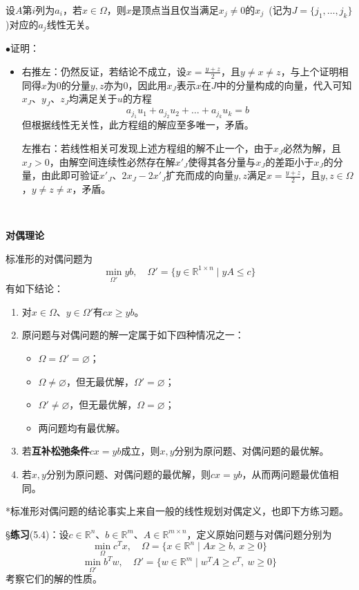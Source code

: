 \documentclass[a4paper,UTF8,fontset=windows]{ctexart}
\newcommand{\exce}[2]{\S\textbf{练习}(#1)：{\kaishu #2}}
\newcommand{\proo}[1]{{\kaishu $\bullet$证明：
\begin{itemize}
    \item[] #1
\end{itemize}
}}
\begin{document}
设$A$第$i$列为$a_i$，若$x\in\Omega$，则$x$是顶点当且仅当满足$x_j\ne0$的$x_j$\ (记为$J=\{j_1,\dots,j_k\}$)对应的$a_j$线性无关。

\proo{
    右推左：仍然反证，若结论不成立，设$x=\frac{y+z}{2}$，且$y\ne x\ne z$，与上个证明相同得$x$为0的分量$y,z$亦为0，因此用$x_J$表示$x$在$J$中的分量构成的向量，代入可知$x_J$、$y_J$、$z_J$均满足关于$u$的方程
    $$a_{j_1}u_1+a_{j_2}u_2+\dots+a_{j_k}u_k=b$$
    但根据线性无关性，此方程组的解应至多唯一，矛盾。

    左推右：若线性相关可发现上述方程组的解不止一个，由于$x_J$必然为解，且$x_J>0$，由解空间连续性必然存在解$x'_J$使得其各分量与$x_J$的差距小于$x_J$的分量，由此即可验证$x'_J$、$2x_J-2x'_J$扩充而成的向量$y,z$满足$x=\frac{y+z}{2}$，且$y,z\in\Omega$，$y\ne z\ne x$，矛盾。
}

\

\textbf{对偶理论}

标准形的对偶问题为
$$\min_{\Omega'} yb,\quad\Omega'=\{y\in\mathbb{R}^{1\times n}\mid yA\le c\}$$
有如下结论：
\begin{enumerate}
    \item 对$x\in\Omega$、$y\in\Omega'$有$cx\ge yb$。
    \item 原问题与对偶问题的解一定属于如下四种情况之一：
    \begin{itemize}
        \item $\Omega=\Omega'=\varnothing$；
        \item $\Omega\ne\varnothing$，但无最优解，$\Omega'=\varnothing$；
        \item $\Omega'\ne\varnothing$，但无最优解，$\Omega=\varnothing$；
        \item 两问题均有最优解。
    \end{itemize}
    \item 若\textbf{互补松弛条件}$cx=yb$成立，则$x,y$分别为原问题、对偶问题的最优解。
    \item 若$x,y$分别为原问题、对偶问题的最优解，则$cx=yb$，从而两问题最优值相同。
\end{enumerate}

*标准形对偶问题的结论事实上来自一般的线性规划对偶定义，也即下方练习题。

\exce{5.4}{设$c\in\mathbb{R}^n$、$b\in\mathbb{R}^m$、$A\in\mathbb{R}^{m\times n}$，定义原始问题与对偶问题分别为
$$\min_\Omega c^Tx,\quad\Omega=\{x\in\mathbb{R}^n\mid Ax\ge b,\ x\ge0\}$$
$$\min_{\Omega'} b^Tw,\quad\Omega'=\{w\in\mathbb{R}^m\mid w^TA\ge c^T,\ w\ge0\}$$
考察它们的解的性质。}

\
\end{document}
